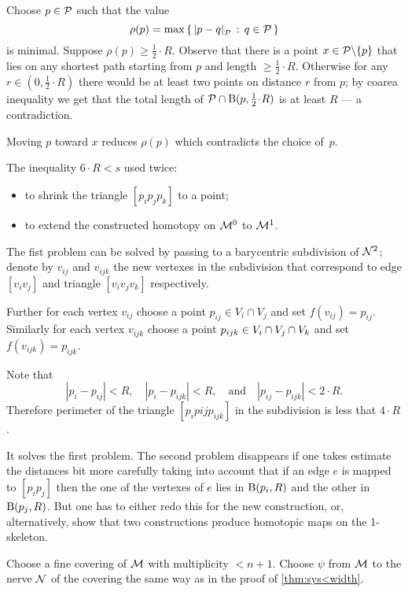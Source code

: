 Choose $p\in\mathcal{P}$ such that the value
\[\rho(p)=\max\set{\dist{p}{q}{\spc{P}}}{q\in\spc{P}}\]
is minimal.
Suppose $\rho(p)\ge\tfrac 12\cdot R$.
Observe that there is a point $x\z\in \spc{P}\backslash\{p\}$ that lies on any shortest path starting from $p$ and length $\ge\tfrac 12\cdot R$.
Otherwise for any $r\in(0,\tfrac 12\cdot R)$ there would be at least two points on distance $r$ from $p$;
by coarea inequality we get that the total length of $\spc{P}\cap \oBall(p,\tfrac 12\cdot R)$ is at least $R$ --- a contradiction.

Moving $p$ toward $x$ reduces $\rho(p)$ which contradicts the choice of~$p$.

The inequality $6\cdot R<s$ used twice:
\begin{itemize}
\item to shrink the triangle $[p_ip_jp_k]$ to a point;
\item to extend the constructed homotopy on $\mathcal{M}^0$ to $\mathcal{M}^1$.
\end{itemize}

The fist problem can be solved by passing to a barycentric subdivision of $\mathcal{N}^2$;
denote by $v_{ij}$ and $v_{ijk}$ the new vertexes in the subdivision that correspond to edge $[v_iv_j]$ and triangle $[v_iv_jv_k]$ respectively.

Further for each vertex $v_{ij}$ choose a point $p_{ij}\in V_i\cap V_j$ and set $f(v_{ij})=p_{ij}$.
Similarly for each vertex $v_{ijk}$ choose a point $p_{ijk}\z\in V_i\cap V_j\cap V_k$ and set $f(v_{ijk})=p_{ijk}$.

Note that 
\[|p_i-p_{ij}|<R,\quad |p_i-p_{ijk}|<R,\quad\text{and}\quad |p_{ij}-p_{ijk}|<2\cdot R.\]
Therefore perimeter of the triangle $[p_ip{ij}p_{ijk}]$ in the subdivision is less that $4\cdot R$.

It solves the first problem.
The second problem disappears if one takes estimate the distances bit more carefully taking into account that if an edge $e$ is mapped to $[p_ip_j]$ then the one of the vertexes of $e$ lies in $\mathrm{B}{}(p_i,R)$ and the other in  $\mathrm{B}{}(p_j,R)$.
But one has to either redo this for the new construction, or, alternatively, show that two constructions produce homotopic maps on the 1-skeleton. 
 
Choose a fine covering of $\mathcal{M}$ with multiplicity $<n+1$.
Choose $\psi$ from $\mathcal{M}$ to the nerve $\mathcal{N}$ of the covering the same way as in the proof of \ref{thm:sys<width}.

